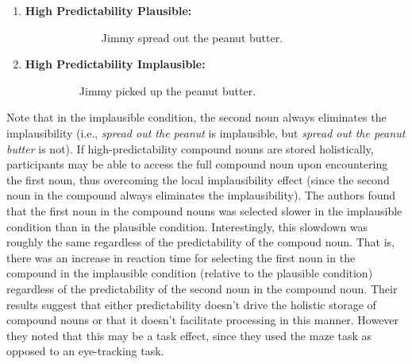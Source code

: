 \documentclass[
  authoryear,
  preprint,
  1p,
  onecolumn]{elsarticle}
\begin{document}
\begin{enumerate}
\def\labelenumi{\arabic{enumi}.}
\item
  \begin{description}
  \item[\textbf{High Predictability Plausible:}]
  ~~~~~~~~Jimmy spread out the peanut butter.
  \end{description}
\item
  \begin{description}
  \item[\textbf{High Predictability Implausible:}]
  ~~~~Jimmy picked up the peanut butter.
  \end{description}
\end{enumerate}

\noindent Note that in the implausible condition, the second noun always
eliminates the implausibility (i.e., \emph{spread out the peanut} is
implausible, but \emph{spread out the peanut butter} is not). If
high-predictability compound nouns are stored holistically, participants
may be able to access the full compound noun upon encountering the first
noun, thus overcoming the local implausibility effect (since the second
noun in the compound always eliminates the implausibility). The authors
found that the first noun in the compound nouns was selected slower in
the implausible condition than in the plausible condition.
Interestingly, this slowdown was roughly the same regardless of the
predictability of the compoud noun. That is, there was an increase in
reaction time for selecting the first noun in the compound in the
implausible condition (relative to the plausible condition) regardless
of the predictability of the second noun in the compound noun. Their
results suggest that either predictability doesn't drive the holistic
storage of compound nouns or that it doesn't facilitate processing in
this manner. However they noted that this may be a task effect, since
they used the maze task as opposed to an eye-tracking task.
\end{document}
